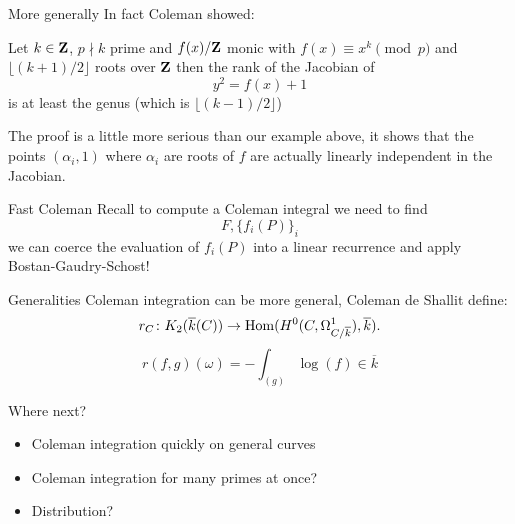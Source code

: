\begin{frame}{More generally}
    In fact Coleman showed:
    \begin{corollary}[Coleman]
        Let $k\in \mathbf{Z}$, $p\nmid k$ prime and $f(x)/\mathbf{Z}$ monic with $f(x) \equiv x^k \pmod p$ and $\lfloor (k+1)/2 \rfloor$ roots over $\mathbf{Z}$ then the rank of the Jacobian of
        \[y^2  = f(x) + 1\]
        is at least the genus (which is $\lfloor (k-1)/2\rfloor$)
    \end{corollary}\pause

    The proof is a little more serious than our example above, it shows that the points $(\alpha_i, 1)$ where $\alpha_i$ are roots of $f$ are actually linearly independent in the Jacobian.
\end{frame}

\begin{frame}{Fast Coleman}
    Recall to compute a Coleman integral we need to find
    \begin{equation*}
        F, \{f_i(P)\}_i
    \end{equation*}\pause
    we can coerce the evaluation of $f_i(P)$ into a linear recurrence and apply Bostan-Gaudry-Schost!
\end{frame}

\begin{frame}{Generalities}
    Coleman integration can be more general, Coleman de Shallit define:
    \[
        r_C \colon K_2(\overline k(C))  \to \operatorname{Hom} (H^0(C, \Omega_{C/\overline k}^1), \overline k)\text{.}
    \]
    \begin{equation*}
        r(f,g)(\omega) = -\int_{(g)} \log(f) \in \overline k
    \end{equation*}

\end{frame}

\begin{frame}{Where next?}
    \begin{itemize}
        \item Coleman integration quickly on general curves
        \item Coleman integration for many primes at once?
        \item Distribution?
    \end{itemize}
\end{frame}






